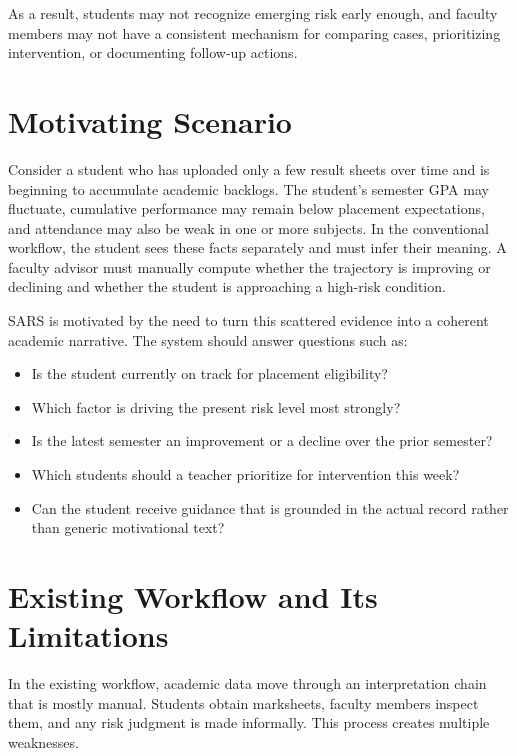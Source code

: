 As a result, students may not recognize emerging risk early enough, and faculty members may not have a consistent mechanism for comparing cases, prioritizing intervention, or documenting follow-up actions.

\section{Motivating Scenario}
Consider a student who has uploaded only a few result sheets over time and is beginning to accumulate academic backlogs. The student's semester GPA may fluctuate, cumulative performance may remain below placement expectations, and attendance may also be weak in one or more subjects. In the conventional workflow, the student sees these facts separately and must infer their meaning. A faculty advisor must manually compute whether the trajectory is improving or declining and whether the student is approaching a high-risk condition.

SARS is motivated by the need to turn this scattered evidence into a coherent academic narrative. The system should answer questions such as:
\begin{itemize}[leftmargin=*]
\item Is the student currently on track for placement eligibility?
\item Which factor is driving the present risk level most strongly?
\item Is the latest semester an improvement or a decline over the prior semester?
\item Which students should a teacher prioritize for intervention this week?
\item Can the student receive guidance that is grounded in the actual record rather than generic motivational text?
\end{itemize}

\section{Existing Workflow and Its Limitations}
In the existing workflow, academic data move through an interpretation chain that is mostly manual. Students obtain marksheets, faculty members inspect them, and any risk judgment is made informally. This process creates multiple weaknesses.

